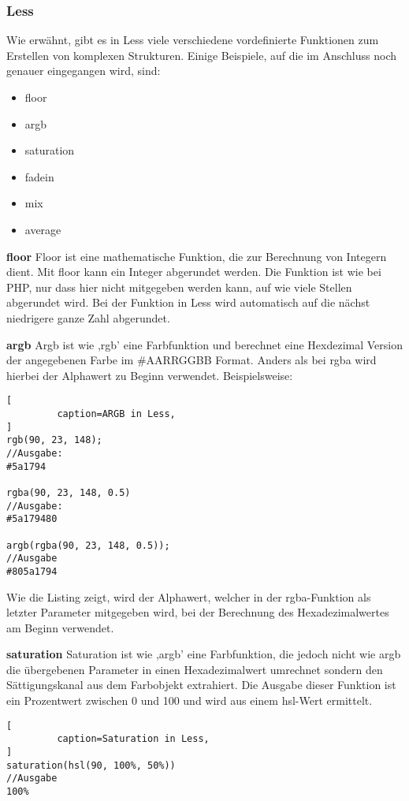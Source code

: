 \subsubsection{Less}
Wie erwähnt, gibt es in Less viele verschiedene vordefinierte Funktionen zum Erstellen von komplexen Strukturen. Einige Beispiele, auf die im Anschluss noch genauer eingegangen wird, sind:
\begin{itemize}
  \item{floor}
  \item{argb}
  \item{saturation}
  \item{fadein}
  \item{mix}
  \item{average}
\end{itemize}
\textbf{floor}\newline
Floor ist eine mathematische Funktion, die zur Berechnung von Integern dient. Mit floor kann ein Integer abgerundet werden. Die Funktion ist wie bei PHP, nur dass hier nicht mitgegeben werden kann, auf wie viele Stellen abgerundet wird. Bei der Funktion in Less wird automatisch auf die nächst niedrigere ganze Zahl abgerundet.

\textbf{argb}\newline
Argb ist wie ,rgb' eine Farbfunktion und berechnet eine Hexdezimal  Version der angegebenen Farbe im \#AARRGGBB Format. Anders als bei rgba wird hierbei der Alphawert zu Beginn verwendet. Beispielsweise:
\begin{lstlisting}[
         caption=ARGB in Less,
]
rgb(90, 23, 148);
//Ausgabe:
#5a1794

rgba(90, 23, 148, 0.5)
//Ausgabe:
#5a179480

argb(rgba(90, 23, 148, 0.5));
//Ausgabe
#805a1794
\end{lstlisting}
Wie die Listing zeigt, wird der Alphawert, welcher in der rgba-Funktion als letzter Parameter mitgegeben wird, bei der Berechnung des Hexadezimalwertes am Beginn verwendet. 

\textbf{saturation}\newline
Saturation ist wie ,argb' eine Farbfunktion, die jedoch nicht wie argb die übergebenen Parameter in einen Hexadezimalwert umrechnet sondern den Sättigungskanal aus dem Farbobjekt extrahiert. Die Ausgabe dieser Funktion ist ein Prozentwert zwischen 0 und 100 und wird aus einem hsl-Wert ermittelt.
\begin{lstlisting}[
         caption=Saturation in Less,
]
saturation(hsl(90, 100%, 50%))
//Ausgabe
100%
\end{lstlisting}

